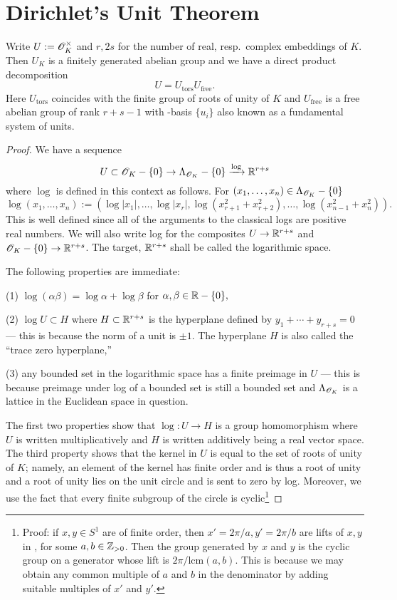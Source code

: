 \documentclass[10pt,a4paper,reqno]{amsart}
\begin{document}
\section{Dirichlet's Unit Theorem}

\begin{thm}
Write $U := \mathscr{O}_K^\times$ and $r,2s$ for the number of real, resp.~complex
embeddings of $K$. Then $U_K$ is a finitely generated abelian group and we have
a direct product decomposition \[U = U_{\mathrm{tors}}U_{\mathrm{free}}.\] Here
$U_{\mathrm{tors}}$ coincides with the finite group of roots of unity of $K$
and $U_{\mathrm{free}}$ is a free abelian group of rank $r+s-1$ with \Z-basis
$\{u_i\}$ also known as a fundamental system of units.
\end{thm}
\begin{proof}
We have a sequence \[U \subset \mathscr{O}_K- \{0\} \rightarrow \Lambda_{\mathscr{O}_K}- \{0\}
\xrightarrow{\log} \mathbb{R}^{r+s} \] where $\log$ is defined in this context as
follows. For $(x_1,\dots,x_n)\in \Lambda_{\mathscr{O}_K} - \{0\}$ \[\log(x_1,\dots,x_n)
:= (\log|x_1|,\dots,\log|x_r|,\log(x^2_{r+1}+x^2_{r+2}),\dots,
\log(x_{n-1}^2+x_n^2)).\] This is well defined since all of the arguments to
the classical logs are positive real numbers. We will also write log for the
composites $U\rightarrow \mathbb{R}^{r+s}$ and $\mathscr{O}_K - \{0\} \rightarrow \mathbb{R}^{r+s}$. The
target, $\mathbb{R}^{r+s}$ shall be called the logarithmic space.

The following properties are immediate:

(1) $\log(\alpha \beta) = \log \alpha + \log \beta$ for $\alpha,\beta \in \mathbb{R} -
\{0\},$

(2) $\log U \subset H$ where $H\subset \mathbb{R}^{r+s}$ is the hyperplane defined by
$y_1+\cdots + y_{r+s} = 0$ --- this is because the norm of a unit is $\pm 1$.
The hyperplane $H$ is also called the ``trace zero hyperplane,''

(3) any bounded set in the logarithmic space has a finite preimage in $U$ ---
this is because preimage under log of a bounded set is still a bounded set and
$\Lambda_{\mathscr{O}_K}$ is a lattice in the Euclidean space in question.

The first two properties show that $\log : U \rightarrow H$ is a group
homomorphism where $U$ is written multiplicatively and $H$ is written
additively being a real vector space. The third property shows that the kernel
in $U$ is equal to the set of roots of unity of $K$; namely, an element of the
kernel has finite order and is thus a root of unity and a root of unity lies on
the unit circle and is sent to zero by log. Moreover, we use the fact that
every finite subgroup of the circle is cyclic\footnote{Proof: if $x,y\in S^1$
are of finite order, then $x' = 2\pi/a, y' = 2\pi/b$ are lifts of $x,y$ in
\R{}, for some $a,b\in \mathbb{Z}_{> 0}$. Then the group generated by $x$ and $y$ is
the cyclic group on a generator whose lift is $2\pi/\mathrm{lcm}(a,b).$ This
is because we may obtain any common multiple of $a$ and $b$ in the
denominator by adding suitable multiples of $x'$ and $y'$.

}
\end{proof}
\end{document}
